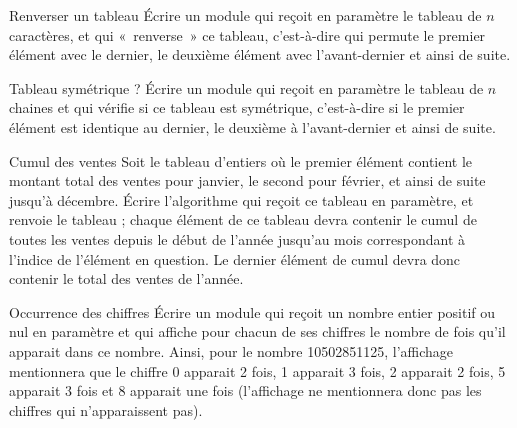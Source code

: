\begin{Exercice}{Renverser un tableau}
	Écrire un module qui reçoit en paramètre le tableau
	 de $n$ caractères, et qui
	«~renverse~» ce tableau, c’est-à-dire qui permute le premier élément
	avec le dernier, le deuxième élément avec l’avant-dernier et ainsi de
	suite.
\end{Exercice}

\begin{Exercice}{Tableau symétrique ?}
	Écrire un module qui reçoit en paramètre le tableau
	 de $n$ chaines et qui
	vérifie si ce tableau est symétrique, c’est-à-dire si le premier
	élément est identique au dernier, le deuxième à l’avant-dernier et
	ainsi de suite.
\end{Exercice}

\begin{Exercice}{Cumul des ventes}
	Soit le tableau  d’entiers où le
	premier élément contient le montant total des ventes pour janvier, le
	second pour février, et ainsi de suite jusqu'à
	décembre. Écrire l’algorithme qui reçoit ce tableau en paramètre, et
	renvoie le tableau  ; chaque élément
	de ce tableau devra contenir le cumul de toutes les ventes depuis le
	début de l’année jusqu’au mois correspondant à
	l'indice de l’élément en question. Le dernier élément
	de cumul devra donc contenir le total des ventes de l’année.
\end{Exercice}

\bigskip
\begin{Exercice}{Occurrence des chiffres}
	Écrire un module qui reçoit un nombre entier positif ou nul en paramètre
	et qui affiche pour chacun de ses chiffres le nombre de fois qu’il
	apparait dans ce nombre. Ainsi, pour le nombre 10502851125, l’affichage
	mentionnera que le chiffre 0 apparait 2 fois, 1 apparait 3 fois, 2
	apparait 2 fois, 5 apparait 3 fois et 8 apparait une fois (l’affichage
	ne mentionnera donc pas les chiffres qui n’apparaissent pas).
\end{Exercice}

